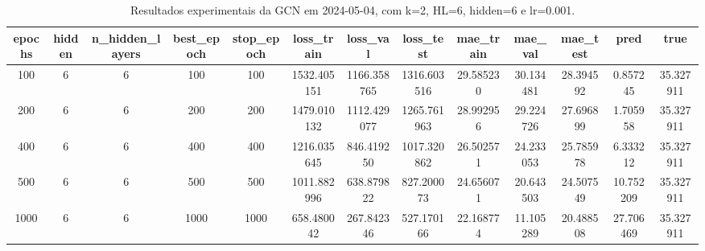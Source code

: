 \begin{table}[h]
\centering
\caption{Resultados experimentais da GCN em 2024-05-04, com k=2, HL=6, hidden=6 e lr=0.001.}
\label{tab:gcn_results_k2_hl6_h6_d20240504}
\begin{tabular}{ccccccccccccc}
\toprule
epochs & hidden & n\_hidden\_layers & best\_epoch & stop\_epoch & loss\_train & loss\_val & loss\_test & mae\_train & mae\_val & mae\_test & pred & true \\
\midrule
100 & 6 & 6 & 100 & 100 & 1532.405151 & 1166.358765 & 1316.603516 & 29.585230 & 30.134481 & 28.394592 & 0.857245 & 35.327911 \\
200 & 6 & 6 & 200 & 200 & 1479.010132 & 1112.429077 & 1265.761963 & 28.992956 & 29.224726 & 27.696899 & 1.705958 & 35.327911 \\
400 & 6 & 6 & 400 & 400 & 1216.035645 & 846.419250 & 1017.320862 & 26.502571 & 24.233053 & 25.785978 & 6.333212 & 35.327911 \\
500 & 6 & 6 & 500 & 500 & 1011.882996 & 638.879822 & 827.200073 & 24.656071 & 20.643503 & 24.507549 & 10.752209 & 35.327911 \\
1000 & 6 & 6 & 1000 & 1000 & 658.480042 & 267.842346 & 527.170166 & 22.168774 & 11.105289 & 20.488508 & 27.706469 & 35.327911 \\
\bottomrule
\end{tabular}
\end{table}
